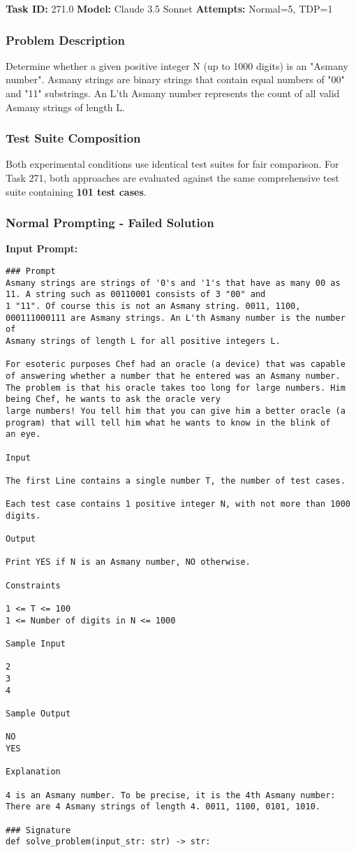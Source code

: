 \documentclass{article}
\begin{document}
\noindent \textbf{Task ID:} 271.0 \quad \textbf{Model:} Claude 3.5 Sonnet \quad \textbf{Attempts:} Normal=5, TDP=1

\subsubsection{Problem Description}
Determine whether a given positive integer N (up to 1000 digits) is an "Asmany number". Asmany strings are binary strings that contain equal numbers of "00" and "11" substrings. An L'th Asmany number represents the count of all valid Asmany strings of length L.

\subsubsection{Test Suite Composition}
Both experimental conditions use identical test suites for fair comparison. For Task 271, both approaches are evaluated against the same comprehensive test suite containing \textbf{101 test cases}.

\subsubsection{Normal Prompting - Failed Solution}

\textbf{Input Prompt:}
\begin{lstlisting}
### Prompt
Asmany strings are strings of '0's and '1's that have as many 00 as 11. A string such as 00110001 consists of 3 "00" and
1 "11". Of course this is not an Asmany string. 0011, 1100, 000111000111 are Asmany strings. An L'th Asmany number is the number of
Asmany strings of length L for all positive integers L.

For esoteric purposes Chef had an oracle (a device) that was capable of answering whether a number that he entered was an Asmany number.
The problem is that his oracle takes too long for large numbers. Him being Chef, he wants to ask the oracle very
large numbers! You tell him that you can give him a better oracle (a program) that will tell him what he wants to know in the blink of
an eye.

Input

The first Line contains a single number T, the number of test cases.

Each test case contains 1 positive integer N, with not more than 1000 digits.

Output

Print YES if N is an Asmany number, NO otherwise.

Constraints

1 <= T <= 100
1 <= Number of digits in N <= 1000

Sample Input

2
3
4

Sample Output

NO
YES

Explanation

4 is an Asmany number. To be precise, it is the 4th Asmany number: There are 4 Asmany strings of length 4. 0011, 1100, 0101, 1010.

### Signature
def solve_problem(input_str: str) -> str:
\end{lstlisting}
\end{document}
